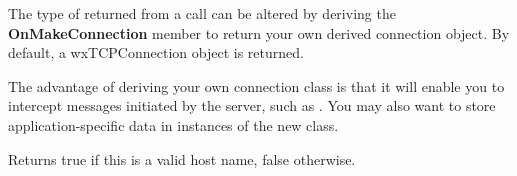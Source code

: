 \label{wxtcpclientonmakeconnection}


The type of  returned from a  call can
be altered by deriving the {\bf OnMakeConnection} member to return your
own derived connection object. By default, a wxTCPConnection
object is returned.

The advantage of deriving your own connection class is that it will
enable you to intercept messages initiated by the server, such
as . You may also want to
store application-specific data in instances of the new class.



Returns true if this is a valid host name, false otherwise.

